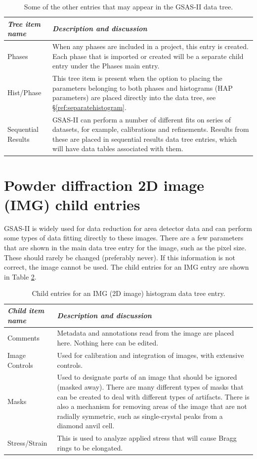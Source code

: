 \begin{table}
\centering
\caption{Some of the other entries that may appear in the GSAS-II data tree.}
\label{tab:OtherTreeItems}
\begin{tabular}{| l | p{} |}
\hline
\textit{Tree item name} & \textit{Description and discussion} \\
\hline
Phases & When any phases are included in a project, this entry is created. Each 
phase that is imported or created will be a separate child entry under the Phases main entry.\\
\hline
Hist/Phase & This tree item is present when the option to placing the parameters belonging to 
both phases and histograms (HAP parameters) are placed directly into the data tree, see \S\ref{ref:separatehistogram}.\\
\hline
Sequential Results & GSAS-II can perform a number of different fits on series of datasets, 
for example, calibrations and refinements. Results from these are placed in sequential results
data tree entries, which will have data tables associated with them.\\
\hline
\end{tabular}
\end{table}

\clearpage
\section{Powder diffraction 2D image (IMG) child entries}
\label{ref:IMGchild}
GSAS-II is widely used for data reduction for area detector data and can perform some types of data fitting directly to these images. There are a few parameters that are shown in the main data tree entry
for the image, such as the pixel size. These should rarely be changed (preferably never). If this information is not correct, the image cannot be used. The child entries for an IMG entry are shown in Table \ref{tab:IMGchild}.

\begin{table}
\centering
\caption{Child entries for an IMG (2D image) histogram data tree entry.}
\label{tab:IMGchild}
\begin{tabular}{| l | p{} |}
\hline
\textit{Child item name} & \textit{Description and discussion} \\
\hline
Comments & Metadata and annotations read from the image are placed here. Nothing here can be edited.\\
\hline
Image Controls & Used for calibration and integration of images, with extensive controls.\\
\hline
Masks & Used to designate parts of an image that should be ignored (masked away). There are many different types of masks that can be created to deal with different types of artifacts. There is also a mechanism for removing areas of the image that are not radially symmetric, such as single-crystal peaks from a diamond anvil cell.\\
\hline
Stress/Strain & This is used to analyze applied stress that will cause Bragg rings to be elongated.\\
\hline
\end{tabular}
\end{table}

